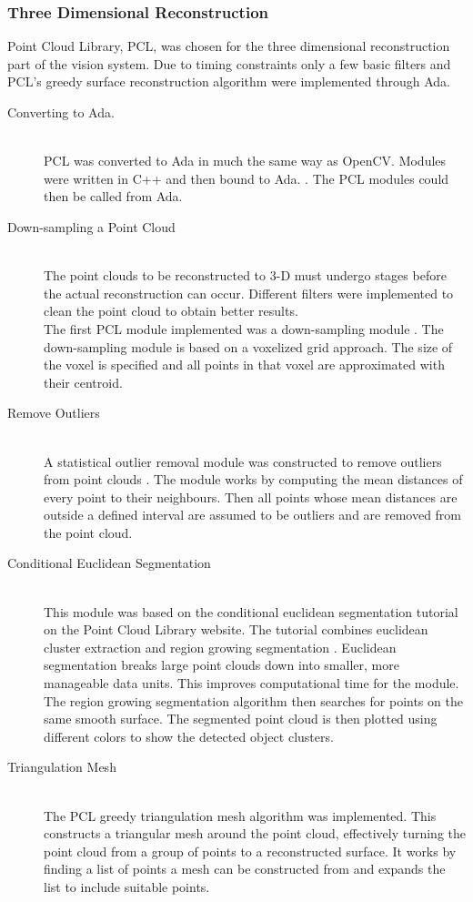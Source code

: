 \subsubsection{Three Dimensional Reconstruction} 
Point Cloud Library, PCL, was chosen for the three dimensional reconstruction part of the vision system. Due to timing constraints only a few basic filters and PCL's greedy surface reconstruction algorithm were implemented through Ada.
\begin{description}
\item[Converting to Ada.]\hfill \\
PCL was converted to Ada in much the same way as OpenCV. Modules were written in C++ and then bound to Ada. \cite{web:newAdaBindings}. The PCL modules could then be called from Ada.

\item[Down-sampling a Point Cloud]\hfill \\
The point clouds to be reconstructed to 3-D must undergo stages before the actual reconstruction can occur. Different filters were implemented to clean the point cloud to obtain better results.
\\The first PCL module implemented was a down-sampling module \cite{web:pclVoxel} . The down-sampling module is based on a voxelized grid approach. The size of the voxel is specified and all points in that voxel are approximated with their centroid.	

\item[Remove Outliers]\hfill \\
A statistical outlier removal module was constructed to remove outliers from point clouds \cite{web:pclOutliers}. The module works by computing the mean distances of every point to their neighbours. Then all points whose mean distances are outside a defined interval are assumed to be outliers and are removed from the point cloud.

\item[Conditional Euclidean Segmentation]\hfill \\
This module was based on the conditional euclidean segmentation tutorial on the Point Cloud Library website\cite{web:PCL}. The tutorial combines euclidean cluster extraction \cite{RusuDoctoralDissertation} and region growing segmentation \cite{web:pclRegionGrowing}. Euclidean segmentation breaks large point clouds down into smaller, more manageable data units. This improves computational time for the module. The region growing segmentation algorithm then searches for points on the same smooth surface. The segmented point cloud is then plotted using different colors to show the detected object clusters.

\item[Triangulation Mesh]\hfill \\
The PCL greedy triangulation mesh algorithm was implemented. This constructs a triangular mesh around the point cloud, effectively turning the point cloud from a group of points to a reconstructed surface. It works by finding a list of points a mesh can be constructed from and expands the list to include suitable points\cite{Marton09ICRA}. 
 
\end{description}